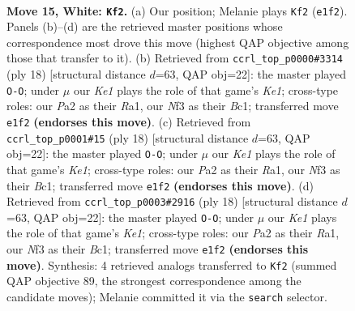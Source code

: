 \documentclass[11pt]{article}
\begin{document}
\clearpage

\begin{figure}[p]\centering
\begin{subfigure}{0.46\textwidth}\centering
\resizebox{\linewidth}{!}{%
\newchessgame
\chessboard[
  setfen={2bq1rk1/rp1n1ppp/n1p1p3/p2pP3/3P1P2/2N2N2/PPPQ2PP/2R1KB1R w K - 4 15},
  showmover=false,
  pgfstyle=straightmove, color=movearrow, markmove={e1-f2}
]}
\caption{}
\end{subfigure}\hfill
\begin{subfigure}{0.46\textwidth}\centering
\resizebox{\linewidth}{!}{%
\newchessgame
\chessboard[
  setfen={rnbq1rk1/1p3pbp/p2p1np1/2pP4/P7/2N2NP1/1P2PPBP/R1BQK2R w KQ - 3 10},
  showmover=false,
  pgfstyle=straightmove, color=movearrow, markmove={e1-g1}
]}
\caption{}
\end{subfigure}
\\[4pt]
\begin{subfigure}{0.46\textwidth}\centering
\resizebox{\linewidth}{!}{%
\newchessgame
\chessboard[
  setfen={rnbq1rk1/1p3pbp/p2p1np1/2pP4/P7/2N2NP1/1P2PPBP/R1BQK2R w KQ - 4 10},
  showmover=false,
  pgfstyle=straightmove, color=movearrow, markmove={e1-g1}
]}
\caption{}
\end{subfigure}\hfill
\begin{subfigure}{0.46\textwidth}\centering
\resizebox{\linewidth}{!}{%
\newchessgame
\chessboard[
  setfen={rnbq1rk1/1p3pbp/p2p1np1/2pP4/P7/2N2NP1/1P2PPBP/R1BQK2R w KQ - 1 10},
  showmover=false,
  pgfstyle=straightmove, color=movearrow, markmove={e1-g1}
]}
\caption{}
\end{subfigure}
\caption{\textbf{Move 15, White: \texttt{Kf2}.} (a) Our position; Melanie plays \texttt{Kf2} (\texttt{e1f2}). Panels (b)--(d) are the retrieved master positions whose correspondence most drove this move (highest QAP objective among those that transfer to it). (b) Retrieved from \texttt{ccrl\_top\_p0000\#3314} (ply 18) [structural distance $d$=63, QAP obj=22]: the master played \texttt{O-O}; under $\mu$ our \emph{Ke1} plays the role of that game's \emph{Ke1}; cross-type roles: our \emph{P}a2 as their \emph{R}a1, our \emph{N}f3 as their \emph{B}c1; transferred move \texttt{e1f2} \textbf{(endorses this move)}. (c) Retrieved from \texttt{ccrl\_top\_p0001\#15} (ply 18) [structural distance $d$=63, QAP obj=22]: the master played \texttt{O-O}; under $\mu$ our \emph{Ke1} plays the role of that game's \emph{Ke1}; cross-type roles: our \emph{P}a2 as their \emph{R}a1, our \emph{N}f3 as their \emph{B}c1; transferred move \texttt{e1f2} \textbf{(endorses this move)}. (d) Retrieved from \texttt{ccrl\_top\_p0003\#2916} (ply 18) [structural distance $d$=63, QAP obj=22]: the master played \texttt{O-O}; under $\mu$ our \emph{Ke1} plays the role of that game's \emph{Ke1}; cross-type roles: our \emph{P}a2 as their \emph{R}a1, our \emph{N}f3 as their \emph{B}c1; transferred move \texttt{e1f2} \textbf{(endorses this move)}. Synthesis: 4 retrieved analogs transferred to \texttt{Kf2} (summed QAP objective 89, the strongest correspondence among the candidate moves); Melanie committed it via the \texttt{search} selector.}
\label{fig:thought-m28}
\end{figure}
\end{document}
